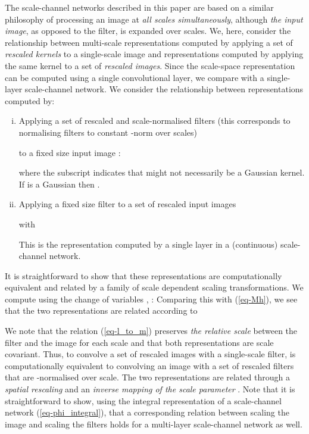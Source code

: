 \documentclass[twocolumn,runningheads]{svjour3}
\begin{document}
The scale-channel networks described in this paper are
based on a similar philosophy of processing an image at 
{\em all scales simultaneously\/}, although {\em the input image\/},
as opposed to the filter, is expanded over scales. We, here, consider
the relationship between multi-scale representations computed by
applying a set of {\em rescaled kernels\/} to a single-scale image and
representations computed by applying the same kernel to a set of
{\em rescaled images\/}. Since the scale-space representation can be computed using a single
convolutional layer, we compare with a single-layer
scale-channel network.
We consider the relationship between representations computed by:  
\begin{enumerate}[(i)]	
	\item 
	Applying a set of rescaled and scale-normalised filters (this
	corresponds to normalising filters to constant -norm over
	scales)  
	
	to a fixed size input image : 
	
	where the subscript indicates that  might not necessarily be
	a Gaussian kernel. If  is a Gaussian then . 
	\item 
	Applying a fixed size filter  to a set of rescaled input images 
	
	with
	
	This is the representation computed by a single layer in a
	(continuous) scale-channel network. 
\end{enumerate}
It is straightforward to show that these representations are
computationally equivalent and related by a family of scale dependent
scaling transformations.
We compute using the change of variables , :
Comparing this with (\ref{eq-Mh}),
we see that the two representations are related according to 

We note that the relation (\ref{eq-l_to_m}) preserves \emph{the
	relative scale} between the filter and the image for each scale and
that both representations are scale covariant.
Thus, to convolve a set of rescaled images with a single-scale filter, is computationally equivalent
to convolving an image with a set of rescaled filters that are
-normalised over scale. The two representations are related
through a \emph{spatial rescaling} and an \emph{inverse mapping of the
	scale parameter} .
Note that it is straightforward to show, using the integral
representation of a scale-channel network (\ref{eq-phi_integral}),
that a corresponding relation between scaling the image and scaling
the filters holds for a multi-layer scale-channel network as well. 
\end{document}
